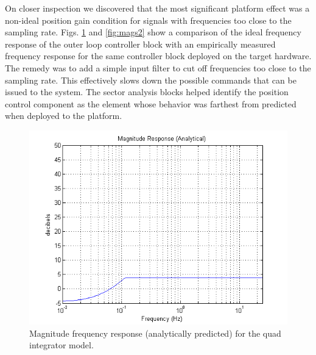 On closer inspection we discovered
that the most significant platform effect was a non-ideal position gain condition for signals
with frequencies too close to the sampling rate.  Figs. \ref{fig:mags1} and 
\ref{fig:mags2} show a comparison of the ideal frequency response of the outer loop
controller block with an empirically measured frequency response for the same controller
block deployed on the target hardware.  The remedy was to add a simple input filter to 
cut off frequencies too close to the sampling rate. This effectively slows down the possible 
commands that can be issued to the system. The sector analysis blocks helped identify 
the position control component as the element whose behavior was farthest from predicted when 
deployed to the platform. 

\begin{figure}[htb]
\centering
\includegraphics[width=\columnwidth]{figures/magresp_analytical}
    \caption{Magnitude frequency response (analytically predicted) for the quad integrator model.}
    \label{fig:mags1}
\end{figure}


